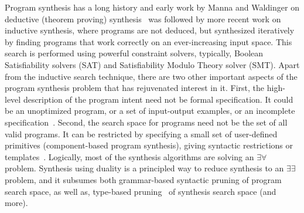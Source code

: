\documentclass[preprint]{sig-alternate-05-2015}
\begin{document}
Program synthesis has a long history and early work by Manna and Waldinger on
deductive (theorem proving) synthesis~\cite{Manna71} was followed by more recent
work on inductive synthesis, where programs
are not deduced, but synthesized iteratively by finding programs that work correctly on an ever-increasing
input space.  This search is performed using powerful constraint solvers, 
typically, Boolean Satisfiability solvers (SAT) and Satisfiability Modulo Theory solver (SMT).
Apart from the inductive search technique, there are two other important aspects of the
program synthesis problem that has rejuvenated interest in it.  First, the high-level description
of the program intent need not be formal specification. It could be 
an unoptimized program, or a set of input-output examples, or an incomplete specification~\cite{icse10}.  
Second, the search space for programs need not be the set of 
all valid programs.  It can be restricted by specifying
a small set of user-defined primitives (component-based program synthesis), 
giving syntactic restrictions or templates~\cite{DBLP:conf/fmcad/AlurBJMRSSSTU13,Solar05,Solar06,bitvector}.
Logically, most of the synthesis algorithms are solving
an $\exists\forall$ problem.
Synthesis using duality is a principled way to reduce synthesis to an
$\exists\exists$ problem, and it subsumes both
grammar-based syntactic pruning of program search space,
as well as, type-based pruning~\cite{DBLP:conf/pldi/OseraZ15} of synthesis search space (and more).
\end{document}
